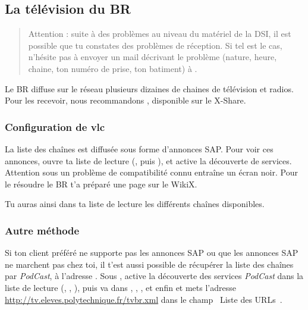 
\subsection{La télévision du BR}
\label{TV}

   \begin{quote}
   Attention : suite à des problèmes au niveau du matériel de la DSI, il est possible que tu constates des problèmes de réception. Si tel est le cas, n'hésite pas à envoyer un mail décrivant le problème (nature, heure, chaine, ton numéro de prise, ton batiment) à .
   \end{quote}

Le BR diffuse sur le réseau plusieurs dizaines de chaines de télévision et radios. Pour les recevoir, nous recommandons , disponible sur le X-Share.

\subsubsection{Configuration de vlc}

La liste des cha\^ines est diffusée sous forme d'annonces SAP. Pour voir ces annonces, ouvre ta liste de lecture (, puis ), et active la découverte de services. Attention sous  un probl\`eme de compatibilité connu entra\^ine un écran noir. Pour le résoudre le BR t'a préparé une page sur le WikiX.


Tu auras ainsi dans ta liste de lecture les différents cha\^{i}nes disponibles.

\subsubsection{Autre méthode}

Si ton client préféré ne supporte pas les annonces SAP ou que les annonces SAP ne marchent pas chez toi, il t'est aussi possible de récupérer la liste des cha\^ines par
\emph{PodCast}, à l'adresse . Sous , active la découverte des services \emph{PodCast} dans la liste de
lecture (, , ), puis va dans , , ,  et enfin  et
mets l'adresse \url{http://tv.eleves.polytechnique.fr/tvbr.xml} dans le champ \guillemotleft~Liste des URLs~\guillemotright .

